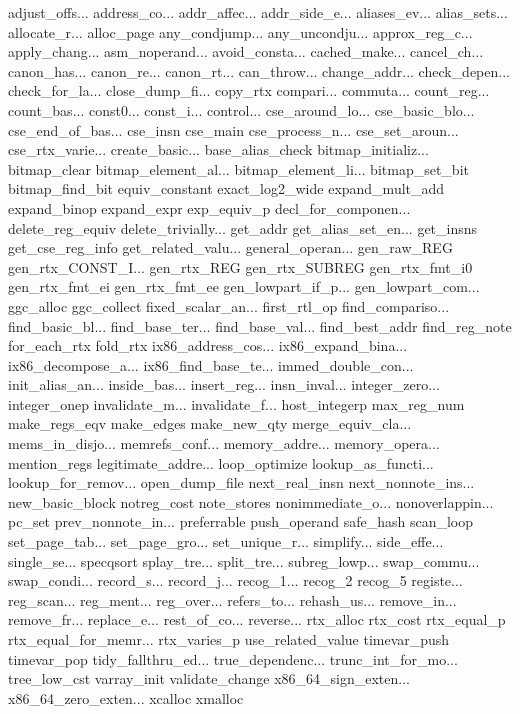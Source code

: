 adjust_offs...
address_co...
addr_affec...
addr_side_e...
aliases_ev...
alias_sets...
allocate_r...
alloc_page
any_condjump...
any_uncondju...
approx_reg_c...
apply_chang...
asm_noperand...
avoid_consta...
cached_make...
cancel_ch...
canon_has...
canon_re...
canon_rt...
can_throw...
change_addr...
check_depen...
check_for_la...
close_dump_fi...
copy_rtx
compari...
commuta...
count_reg...
count_bas...
const0...
const_i...
control...
cse_around_lo...
cse_basic_blo...
cse_end_of_bas...
cse_insn
cse_main
cse_process_n...
cse_set_aroun...
cse_rtx_varie...
create_basic...
base_alias_check
bitmap_initializ...
bitmap_clear
bitmap_element_al...
bitmap_element_li...
bitmap_set_bit
bitmap_find_bit
equiv_constant
exact_log2_wide
expand_mult_add
expand_binop
expand_expr
exp_equiv_p
decl_for_componen...
delete_reg_equiv
delete_trivially...
get_addr
get_alias_set_en...
get_insns
get_cse_reg_info
get_related_valu...
general_operan...
gen_raw_REG
gen_rtx_CONST_I...
gen_rtx_REG
gen_rtx_SUBREG
gen_rtx_fmt_i0
gen_rtx_fmt_ei
gen_rtx_fmt_ee
gen_lowpart_if_p...
gen_lowpart_com...
ggc_alloc
ggc_collect
fixed_scalar_an...
first_rtl_op
find_compariso...
find_basic_bl...
find_base_ter...
find_base_val...
find_best_addr
find_reg_note
for_each_rtx
fold_rtx
ix86_address_cos...
ix86_expand_bina...
ix86_decompose_a...
ix86_find_base_te...
immed_double_con...
init_alias_an...
inside_bas...
insert_reg...
insn_inval...
integer_zero...
integer_onep
invalidate_m...
invalidate_f...
host_integerp
max_reg_num
make_regs_eqv
make_edges
make_new_qty
merge_equiv_cla...
mems_in_disjo...
memrefs_conf...
memory_addre...
memory_opera...
mention_regs
legitimate_addre...
loop_optimize
lookup_as_functi...
lookup_for_remov...
open_dump_file
next_real_insn
next_nonnote_ins...
new_basic_block
notreg_cost
note_stores
nonimmediate_o...
nonoverlappin...
pc_set
prev_nonnote_in...
preferrable
push_operand
safe_hash
scan_loop
set_page_tab...
set_page_gro...
set_unique_r...
simplify...
side_effe...
single_se...
specqsort
splay_tre...
split_tre...
subreg_lowp...
swap_commu...
swap_condi...
record_s...
record_j...
recog_1...
recog_2
recog_5
registe...
reg_scan...
reg_ment...
reg_over...
refers_to...
rehash_us...
remove_in...
remove_fr...
replace_e...
rest_of_co...
reverse...
rtx_alloc
rtx_cost
rtx_equal_p
rtx_equal_for_memr...
rtx_varies_p
use_related_value
timevar_push
timevar_pop
tidy_fallthru_ed...
true_dependenc...
trunc_int_for_mo...
tree_low_cst
varray_init
validate_change
x86_64_sign_exten...
x86_64_zero_exten...
xcalloc
xmalloc
